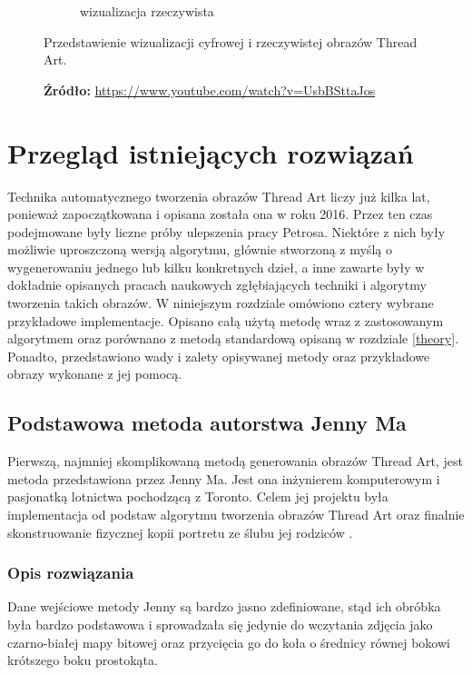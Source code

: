 \begin{figure}[H]
\begin{subfigure}{0.49\textwidth}
            \caption{wizualizacja rzeczywista}
            \label{theory-technics-vis-comp-b}
        \end{subfigure}
        \caption{Przedstawienie wizualizacji cyfrowej i rzeczywistej obrazów Thread Art.}
        \caption*{\footnotesize{\textbf{Źródło:}
        \url{https://www.youtube.com/watch?v=UsbBSttaJos}}}
        \label{theory-technics-vis-comp}
        \end{figure}
            
\chapter{Przegląd istniejących rozwiązań} \label{others}
Technika automatycznego tworzenia obrazów Thread Art liczy już kilka lat, ponieważ zapoczątkowana i opisana została ona w roku 2016. Przez ten czas podejmowane były liczne próby ulepszenia pracy Petrosa. Niektóre z nich były możliwie uproszczoną wersją algorytmu, głównie stworzoną z myślą o wygenerowaniu jednego lub kilku konkretnych dzieł, a inne zawarte były w dokładnie opisanych pracach naukowych zgłębiających techniki i algorytmy tworzenia takich obrazów. W niniejszym rozdziale omówiono cztery wybrane przykładowe implementacje. Opisano całą użytą metodę wraz z zastosowanym algorytmem oraz porównano z metodą standardową opisaną w rozdziale \ref{theory}. Ponadto, przedstawiono wady i zalety opisywanej metody oraz przykładowe obrazy wykonane z jej pomocą.
    \section{Podstawowa metoda autorstwa Jenny Ma} \label{others-jenny}
    Pierwszą, najmniej skomplikowaną metodą generowania obrazów Thread Art, jest metoda przedstawiona przez Jenny Ma. Jest ona inżynierem komputerowym i pasjonatką lotnictwa pochodzącą z Toronto. Celem jej projektu była implementacja od podstaw algorytmu tworzenia obrazów Thread Art oraz finalnie skonstruowanie fizycznej kopii portretu ze ślubu jej rodziców \cite{jenny-youtube}.
        \subsection{Opis rozwiązania}
        Dane wejściowe metody Jenny są bardzo jasno zdefiniowane, stąd ich obróbka była bardzo podstawowa i sprowadzała się jedynie do wczytania zdjęcia jako czarno-białej mapy bitowej oraz przycięcia go do koła o średnicy równej bokowi krótszego boku prostokąta. 
        
